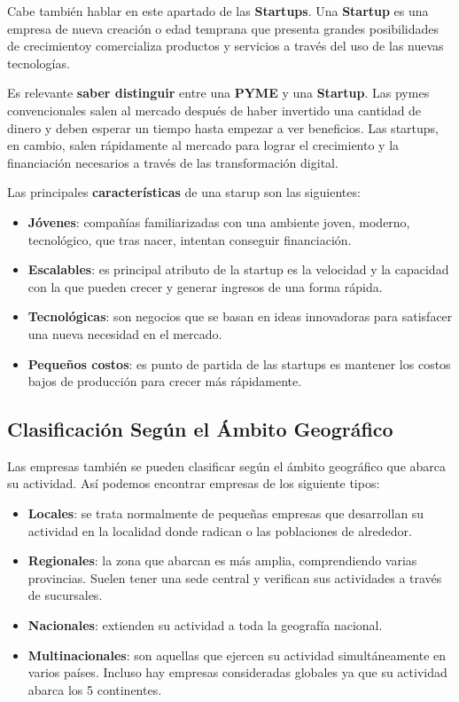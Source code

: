 Cabe también hablar en este apartado de las \textbf{Startups}. Una \textbf{Startup} es una empresa de nueva creación o edad temprana que presenta grandes posibilidades de crecimientoy comercializa productos y servicios a través del uso de las nuevas tecnologías.

Es relevante \textbf{saber distinguir} entre una \textbf{PYME} y una \textbf{Startup}. Las pymes convencionales salen al mercado después de haber invertido una cantidad de dinero y deben esperar un tiempo hasta empezar a ver beneficios. Las startups, en cambio, salen rápidamente al mercado para lograr el crecimiento y la financiación necesarios a través de las transformación digital.

Las principales \textbf{características} de una starup son las siguientes:

\begin{itemize}
    \item \textbf{Jóvenes}: compañías familiarizadas con una ambiente joven, moderno, tecnológico, que tras nacer, intentan conseguir financiación.
    \item \textbf{Escalables}: es principal atributo de la startup es la velocidad y la capacidad con la que pueden crecer y generar ingresos de una forma rápida.
    \item \textbf{Tecnológicas}: son negocios que se basan en ideas innovadoras para satisfacer una nueva necesidad en el mercado.
    \item \textbf{Pequeños costos}: es punto de partida de las startups es mantener los costos bajos de producción para crecer más rápidamente.
\end{itemize}

\subsection{Clasificación Según el Ámbito Geográfico}
Las empresas también se pueden clasificar según el ámbito geográfico que abarca su actividad. Así podemos encontrar empresas de los siguiente tipos:

\begin{itemize}
    \item \textbf{Locales}: se trata normalmente de pequeñas empresas que desarrollan su actividad en la localidad donde radican o las poblaciones de alrededor.
    \item \textbf{Regionales}: la zona que abarcan es más amplia, comprendiendo varias provincias. Suelen tener una sede central y verifican sus actividades a través de sucursales.
    \item \textbf{Nacionales}: extienden su actividad a toda la geografía nacional.
    \item \textbf{Multinacionales}: son aquellas que ejercen su actividad simultáneamente en varios países. Incluso hay empresas consideradas globales ya que su actividad abarca los 5 continentes.
\end{itemize}

